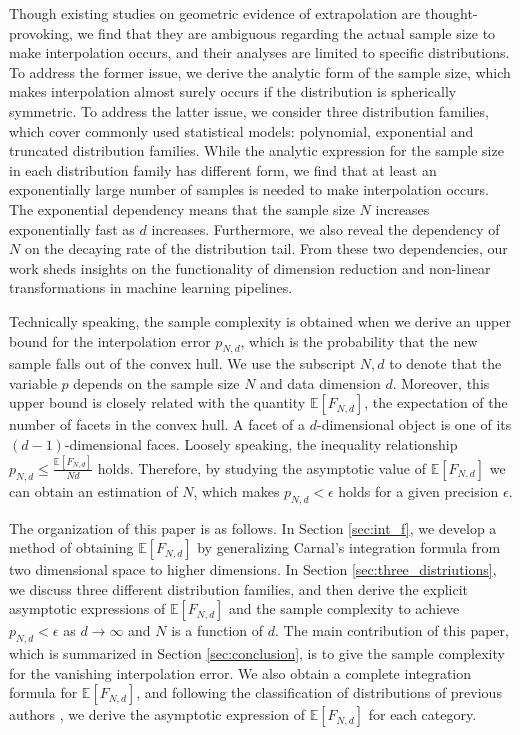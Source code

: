 \documentclass[conference,a4paper]{IEEEtran}
\def\E{\mathbb{E}}
\begin{document}
Though existing studies on geometric evidence of extrapolation are thought-provoking,
we find that they are ambiguous regarding the actual sample size
to make interpolation occurs, and
their analyses are limited to specific distributions.
To address the former issue, we derive the analytic form of the sample size, which makes
interpolation almost surely occurs if the distribution is spherically symmetric.
To address the latter issue,
we consider three distribution families, which cover commonly used statistical models:
polynomial,
exponential and truncated distribution families.
While the analytic expression for the sample size in each distribution family
has different form, we find that at least an exponentially large number of samples is needed to make interpolation occurs.
The exponential dependency means that the sample size $N$ increases exponentially fast as $d$ increases.
Furthermore, we also reveal the dependency of $N$ on the decaying rate of the distribution tail.
From these two dependencies, our work sheds insights on
the functionality of dimension reduction and non-linear transformations in machine learning pipelines.


Technically speaking, the sample complexity is obtained when we derive an upper bound for the interpolation error
$p_{N,d}$,
which is the probability that the new sample falls out of the convex hull.
We use the subscript $N,d$ to denote that the variable $p$ depends on the sample size $N$ and data dimension $d$.
Moreover, this upper bound is closely related with the quantity $\E[F_{N,d}]$,
the expectation of the number of facets in the convex hull. A facet of a $d$-dimensional object is one of its $(d-1)$-dimensional faces.
Loosely speaking,
the inequality relationship $p_{N,d} \leq \frac{\E[F_{N,d}]}{Nd}$ holds. 
Therefore, by studying the asymptotic value of $\E[F_{N,d}]$ we can obtain an estimation of $N$, which makes $p_{N,d}<\epsilon$ holds
for a given precision $\epsilon$.

The organization of this paper is as follows. In Section \ref{sec:int_f}, we develop a method of obtaining $\E[F_{N,d}]$ by generalizing Carnal's integration formula
from two dimensional space to higher dimensions.
In Section \ref{sec:three_distriutions}, we discuss three different distribution families, and then derive the explicit asymptotic
expressions of $\E[F_{N,d}]$ and the sample complexity to achieve $p_{N,d}<\epsilon$ as $d\to\infty$ and $N$ is a function of $d$.
The main contribution of this paper,
which is summarized in Section \ref{sec:conclusion},
is to give the sample complexity for the vanishing interpolation error.
We also obtain a complete integration formula for $\E[F_{N,d}]$,
and following the classification of distributions of previous authors \cite{carnal1970konvexe,dwyer1991convex},
we derive the asymptotic expression
of $\E[F_{N,d}]$ for each category.
\end{document}
